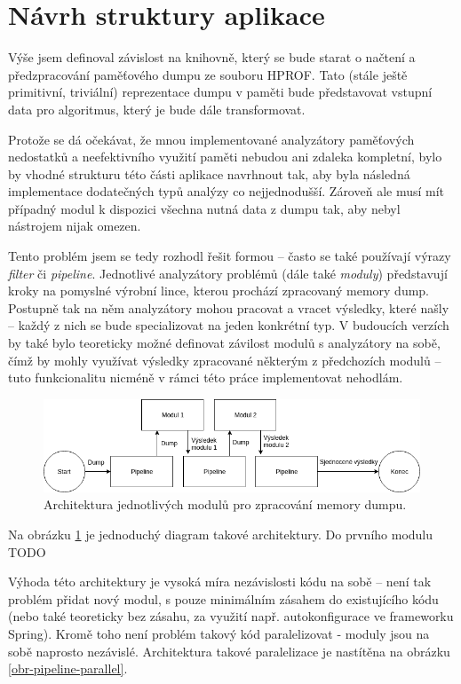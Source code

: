 \section{Návrh struktury aplikace}
Výše jsem definoval závislost na knihovně, který se bude starat o načtení a předzpracování paměťového dumpu ze souboru HPROF. Tato (stále ještě primitivní, triviální) reprezentace dumpu v paměti bude představovat vstupní data pro algoritmus, který je bude dále transformovat.

Protože se dá očekávat, že mnou implementované analyzátory paměťových nedostatků a neefektivního využití paměti nebudou ani zdaleka kompletní, bylo by vhodné strukturu této části aplikace navrhnout tak, aby byla následná implementace dodatečných typů analýzy co nejjednodušší. Zároveň ale musí mít případný modul k dispozici všechna nutná data z dumpu tak, aby nebyl nástrojem nijak omezen.

Tento problém jsem se tedy rozhodl řešit formou  -- často se také používají výrazy \textit{filter} či \textit{pipeline}. Jednotlivé analyzátory problémů (dále také \textit{moduly}) představují kroky na pomyslné výrobní lince, kterou prochází zpracovaný memory dump. Postupně tak na něm analyzátory mohou pracovat a vracet výsledky, které našly -- každý z nich se bude specializovat na jeden konkrétní typ. V budoucích verzích by také bylo teoreticky možné definovat závilost modulů s analyzátory na sobě, čímž by mohly využívat výsledky zpracované některým z předchozích modulů -- tuto funkcionalitu nicméně v rámci této práce implementovat nehodlám.

\begin{figure}[ht!]
	\centering
	\includegraphics[scale=0.55]{obrazky/pipeline.png}
	\caption{Architektura jednotlivých modulů pro zpracování memory dumpu.}
	\label{obr-pipeline}
\end{figure}

Na obrázku \ref{obr-pipeline} je jednoduchý diagram takové architektury. Do prvního modulu TODO

Výhoda této architektury je vysoká míra nezávislosti kódu na sobě -- není tak problém přidat nový modul, s pouze minimálním zásahem do existujícího kódu (nebo také teoreticky bez zásahu, za využití např. autokonfigurace ve frameworku Spring). Kromě toho není problém takový kód paralelizovat - moduly jsou na sobě naprosto nezávislé. Architektura takové paralelizace je nastítěna na obrázku \ref{obr-pipeline-parallel}.

